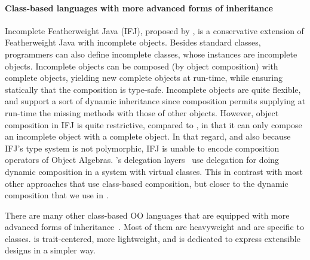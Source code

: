 \paragraph{Class-based languages with more advanced forms of inheritance}

Incomplete Featherweight Java (IFJ), proposed by \citet{bettini2008type}, is a
conservative extension of Featherweight Java with incomplete objects. Besides
standard classes, programmers can also define incomplete classes, whose
instances are incomplete objects. Incomplete objects can be composed (by object
composition) with complete objects, yielding new complete objects at run-time,
while ensuring statically that the composition is type-safe. Incomplete objects
are quite flexible, and support a sort of dynamic inheritance since composition
permits supplying at run-time the missing methods with those of other objects.
However, object composition in IFJ is quite restrictive, compared to \name, in
that it can only compose an incomplete object with a complete object. In that
regard, and also because IFJ's type system is not polymorphic, IFJ is unable to
encode composition operators of Object Algebras.
\citeauthor{ostermann2002dynamically}'s delegation
layers~\citep{ostermann2002dynamically} use delegation for doing dynamic
composition in a system with virtual classes. This in contrast with most other
approaches that use class-based composition, but closer to the dynamic
composition that we use in \name.

There are many other class-based OO languages that are equipped with more
advanced forms of
inheritance~\cite{meyer1987eiffel,buchi2000generic,ostermann2001object,kniesel1999type}.
Most of them are heavyweight and are specific to classes. \name is
trait-centered, more lightweight, and is dedicated to express extensible designs
in a simpler way.




